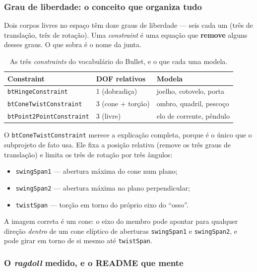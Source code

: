 \subsubsection{Grau de liberdade: o conceito que organiza tudo}

Dois corpos livres no espaço têm doze graus de liberdade --- seis cada um (três
de translação, três de rotação). Uma \emph{constraint} é uma equação que
\textbf{remove} alguns desses graus. O que sobra é o nome da junta.

\begin{table}[htbp]
\centering
\caption{As três \emph{constraints} do vocabulário do Bullet, e o que cada uma modela.}
\label{tab:constraints}
\footnotesize
\begin{tabular}{@{}llp{}@{}}
\toprule
\textbf{Constraint} & \textbf{DOF relativos} & \textbf{Modela} \\
\midrule
\texttt{btHingeConstraint}      & 1 (dobradiça)     & joelho, cotovelo, porta \\
\texttt{btConeTwistConstraint}  & 3 (cone + torção) & ombro, quadril, pescoço \\
\texttt{btPoint2PointConstraint}& 3 (livre)         & elo de corrente, pêndulo \\
\bottomrule
\end{tabular}
\end{table}

O \texttt{btConeTwistConstraint} merece a explicação completa, porque é o único
que o subprojeto de fato usa. Ele fixa a posição relativa (remove os três graus
de translação) e limita os três de rotação por três ângulos:

\begin{itemize}
  \item \texttt{swingSpan1} --- abertura máxima do cone num plano;
  \item \texttt{swingSpan2} --- abertura máxima no plano perpendicular;
  \item \texttt{twistSpan} --- torção em torno do próprio eixo do ``osso''.
\end{itemize}

A imagem correta é um cone: o eixo do membro pode apontar para qualquer direção
\emph{dentro} de um cone elíptico de aberturas \texttt{swingSpan1} e
\texttt{swingSpan2}, e pode girar em torno de si mesmo até \texttt{twistSpan}.

\subsubsection{O \emph{ragdoll} medido, e o README que mente}

